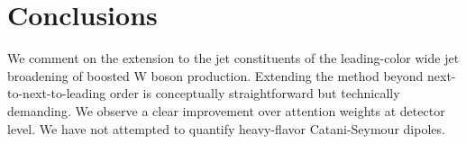 \section{Conclusions}\label{sec:conclusions}

We comment on the extension to the jet constituents of the leading-color
wide jet broadening of boosted W boson production. Extending the method
beyond next-to-next-to-leading order is conceptually straightforward but
technically demanding. We observe a clear improvement over attention
weights at detector level. We have not attempted to quantify
heavy-flavor Catani-Seymour dipoles.

